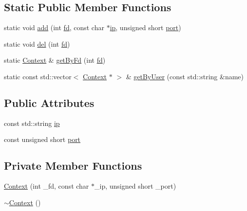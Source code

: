 \subsection*{Static Public Member Functions}
\begin{DoxyCompactItemize}
\item 
static void \hyperlink{classContext_a732d579c381e6bcbc3d8899c8266f4d0}{add} (int \hyperlink{classContext_aaf11c36966be14b2e1e53ee43c8e91dd}{fd}, const char $\ast$\hyperlink{classContext_a3508ad395f4b0c7e61ad46b247307f50}{ip}, unsigned short \hyperlink{classContext_a68ab96bf75c30c3497312f95ace6de91}{port})
\item 
static void \hyperlink{classContext_ab5d0194f847307302b65a387515effb8}{del} (int \hyperlink{classContext_aaf11c36966be14b2e1e53ee43c8e91dd}{fd})
\item 
static \hyperlink{classContext}{Context} \& \hyperlink{classContext_ab985f83f8262651fd9df85ba1bcb47fe}{get\+By\+Fd} (int \hyperlink{classContext_aaf11c36966be14b2e1e53ee43c8e91dd}{fd})
\item 
static const std\+::vector$<$ \hyperlink{classContext}{Context} $\ast$ $>$ \& \hyperlink{classContext_adc40dec3fe28c127523cae55097a91ce}{get\+By\+User} (const std\+::string \&name)
\end{DoxyCompactItemize}
\subsection*{Public Attributes}
\begin{DoxyCompactItemize}
\item 
const std\+::string \hyperlink{classContext_a3508ad395f4b0c7e61ad46b247307f50}{ip}
\item 
const unsigned short \hyperlink{classContext_a68ab96bf75c30c3497312f95ace6de91}{port}
\end{DoxyCompactItemize}
\subsection*{Private Member Functions}
\begin{DoxyCompactItemize}
\item 
\hyperlink{classContext_a1f8fc23ba0333d55461a81555e368162}{Context} (int \+\_\+fd, const char $\ast$\+\_\+ip, unsigned short \+\_\+port)
\item 
\hyperlink{classContext_a2d34e4556448e40693f61d15e091b604}{$\sim$\+Context} ()
\end{DoxyCompactItemize}
